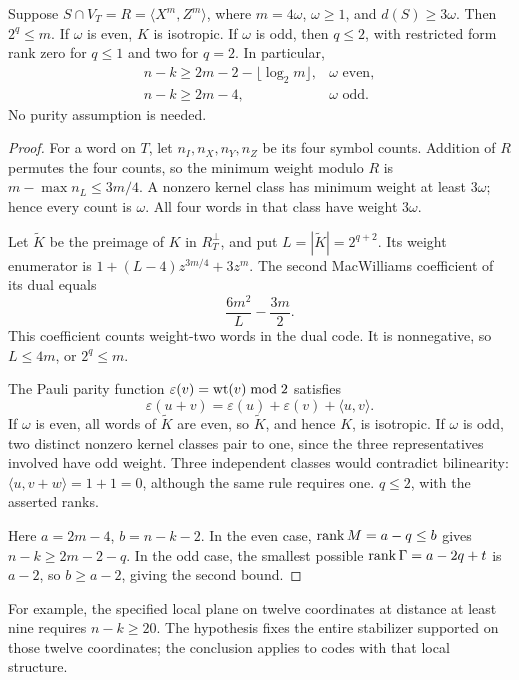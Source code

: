 \begin{theorem}\label{thm:balanced}
Suppose \(S\cap V_T=R=\langle X^m,Z^m\rangle\), where \(m=4\omega\),
\(\omega\geq1\), and \(d(S)\geq3\omega\). Then \(2^q\leq m\).
If \(\omega\) is even, \(K\) is isotropic. If \(\omega\) is odd, then
\(q\leq2\), with restricted form rank zero for \(q\leq1\) and two
for \(q=2\). In particular,
\[
 \begin{array}{ll}
 n-k\geq2m-2-\lfloor\log_2m\rfloor,&\omega\text{ even},\\
 n-k\geq2m-4,&\omega\text{ odd}.
 \end{array}
\]
No purity assumption is needed.
\end{theorem}
\begin{proof}
For a word on \(T\), let \(n_I,n_X,n_Y,n_Z\) be its four symbol
counts. Addition of \(R\) permutes the four counts, so the minimum
weight modulo \(R\) is \(m-\max n_L\leq3m/4\). A nonzero kernel class has minimum weight
at least \(3\omega\); hence every count is \(\omega\). All four words in that
class have weight \(3\omega\).

Let \(\widetilde{K}\) be the preimage of \(K\) in \(R_T^\perp\), and put
\(L=|\widetilde{K}|=2^{q+2}\). Its weight enumerator is
\(1+(L-4)z^{3m/4}+3z^m\). The second MacWilliams coefficient of its
dual equals
\[
 \frac{6m^2}{L}-\frac{3m}{2}.
\]
This coefficient counts weight-two words in the dual code. It is
nonnegative, so \(L\leq4m\), or \(2^q\leq m\).

The Pauli parity function \(\varepsilon(v)=\operatorname{wt}(v)\bmod2\) satisfies
\begin{equation}\label{eq:polar}
 \varepsilon(u+v)=\varepsilon(u)+\varepsilon(v)+\langle u,v\rangle.
\end{equation}
If \(\omega\) is even, all words of \(\widetilde{K}\) are even, so \(\widetilde{K}\), and hence
\(K\), is isotropic. If \(\omega\) is odd, two distinct nonzero kernel
classes pair to one, since the three representatives involved have odd
weight. Three independent classes would contradict bilinearity:
\(\langle u,v+w\rangle=1+1=0\), although the same rule requires one.
\(q\leq2\), with the asserted ranks.

Here \(a=2m-4\), \(b=n-k-2\). In the even case,
\(\operatorname{rank} M=a-q\leq b\) gives \(n-k\geq2m-2-q\).
In the odd case, the smallest possible \(\operatorname{rank}\Gamma=a-2q+t\)
is \(a-2\), so \(b\geq a-2\), giving the second bound.
\end{proof}

For example, the specified local plane on twelve coordinates at distance
at least nine requires \(n-k\geq20\). The hypothesis fixes the entire stabilizer supported on those twelve
coordinates; the conclusion applies to codes with that local structure.

